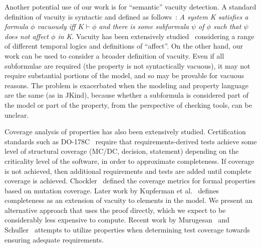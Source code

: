 Another potential use of our work is for ``semantic'' vacuity detection.  A standard definition of vacuity is syntactic and defined as follows~\cite{Kupferman:2006:SCF}: {\em A system K satisfies a formula $\phi$ vacuously iff $K \vdash \phi$ and there is some subformula $\psi$ of $\phi$ such that $\psi$ does not affect $\phi$ in K}.  Vacuity has been extensively studied~\cite{Gurfinkel:2012:RVB,Chockler2008,DBLP:Ben-DavidK13,Kupferman:2006:SCF,Chockler:2007,Beer1997} considering a range of different temporal logics and definitions of ``affect''.  On the other hand, our work can be used to consider a broader definition of vacuity.  Even if all subformulae are required (the property is not syntactically vacuous), it may not require substantial portions of the model, and so may be provable for vacuous reasons.  The problem is exacerbated when the modeling and property language are the same (as in JKind), because whether a subformula is considered part of the model or part of the property, from the perspective of checking tools, can be unclear.

Coverage analysis of properties has also been extensively studied. Certification standards such as DO-178C~\cite{DO178C} require that requirements-derived tests achieve some level of structural coverage (MC/DC, decision, statement) depending on the criticality level of the software, in order to approximate completeness.  If coverage is not achieved, then additional requirements and tests are added until complete coverage is achieved.  Chockler~\cite{chockler_coverage_2003} defined the coverage metrics for formal properties based on mutation coverage.  Later work by Kupferman et al.~\cite{Kupferman:2006:SCF} defines completeness as an extension of vacuity to elements in the model.  We present an alternative approach that uses the proof directly, which we expect to be considerably less expensive to compute.  Recent work by Murugesan~\cite{murugesan2015we} and Schuller~\cite{schuler_assessing_2011} attempts to utilize properties when determining test coverage towards ensuring adequate requirements.




\iffalse
\begin{itemize}
    \item MUS's : checked
    \item Work on Alloy: checked
    \item Work that Teme pointed us to : will be added
    \item Anything else Elaheh has found : \%60 checked
\end{itemize}
\fi

